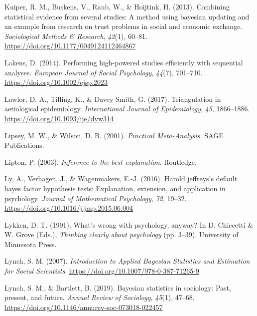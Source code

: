\documentclass[
]{interact}
\newlength{\cslhangindent}
\newlength{\cslentryspacingunit} %
\newenvironment{CSLReferences}[2] %
    {%
  \setlength{\parindent}{0pt}
  \ifodd #1
  \let\oldpar\par
  \def\par{\hangindent=\cslhangindent\oldpar}
  \fi
  \setlength{\parskip}{#2\cslentryspacingunit}
 }%
 {}
\begin{document}
\begin{CSLReferences}{1}{0}
\leavevmode{}%
Kuiper, R. M., Buskens, V., Raub, W., \& Hoijtink, H. (2013). Combining
statistical evidence from several studies: A method using bayesian
updating and an example from research on trust problems in social and
economic exchange. \emph{Sociological Methods \& Research},
\emph{42}(1), 60--81. \url{https://doi.org/10.1177/0049124112464867}

\leavevmode{}%
Lakens, D. (2014). Performing high-powered studies efficiently with
sequential analyses. \emph{European Journal of Social Psychology},
\emph{44}(7), 701--710. \url{https://doi.org/10.1002/ejsp.2023}

\leavevmode{}%
Lawlor, D. A., Tilling, K., \& Davey Smith, G. (2017). Triangulation in
aetiological epidemiology. \emph{International Journal of Epidemiology},
\emph{45}, 1866--1886. \url{https://doi.org/10.1093/ije/dyw314}

\leavevmode{}%
Lipsey, M. W., \& Wilson, D. B. (2001). \emph{Practical
{M}eta-{A}nalysis.} SAGE Publications.

\leavevmode{}%
Lipton, P. (2003). \emph{Inference to the best explanation}. Routledge.

\leavevmode{}%
Ly, A., Verhagen, J., \& Wagenmakers, E.-J. (2016). Harold jeffreys's
                    default bayes factor hypothesis tests: Explanation, extension, and
                    application in psychology. \emph{Journal of Mathematical Psychology},
                    \emph{72}, 19--32. \url{https://doi.org/10.1016/j.jmp.2015.06.004}
                    
                    \leavevmode{}%
                    Lykken, D. T. (1991). What's wrong with psychology, anyway? In D.
Chiccetti \& W. Grove (Eds.), \emph{Thinking clearly about psychology}
(pp. 3--39). University of Minnesota Press.

\leavevmode{}%
Lynch, S. M. (2007). \emph{Introduction to {Applied} {Bayesian}
{Statistics} and {Estimation} for {Social} {Scientists}}.
\url{https://doi.org/10.1007/978-0-387-71265-9}

\leavevmode{}%
Lynch, S. M., \& Bartlett, B. (2019). Bayesian statistics in sociology:
Past, present, and future. \emph{Annual Review of Sociology},
\emph{45}(1), 47--68.
\url{https://doi.org/10.1146/annurev-soc-073018-022457}


\end{CSLReferences}
\end{document}
